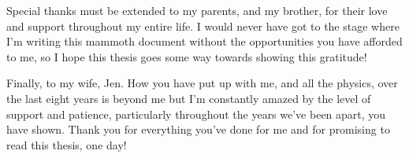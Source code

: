 \begin{acknowledgements}
  Special thanks must be extended to my parents, and my brother, for their love and support throughout my entire life.  I would never have got to the stage where I'm writing this mammoth document without the opportunities you have afforded to me, so I hope this thesis goes some way towards showing this gratitude!

  Finally, to my wife, Jen.  How you have put up with me, and all the physics, over the last eight years is beyond me but I'm constantly amazed by the level of support and patience, particularly throughout the years we've been apart, you have shown.  Thank you for everything you've done for me and for promising to read this thesis, one day!












\end{acknowledgements}
